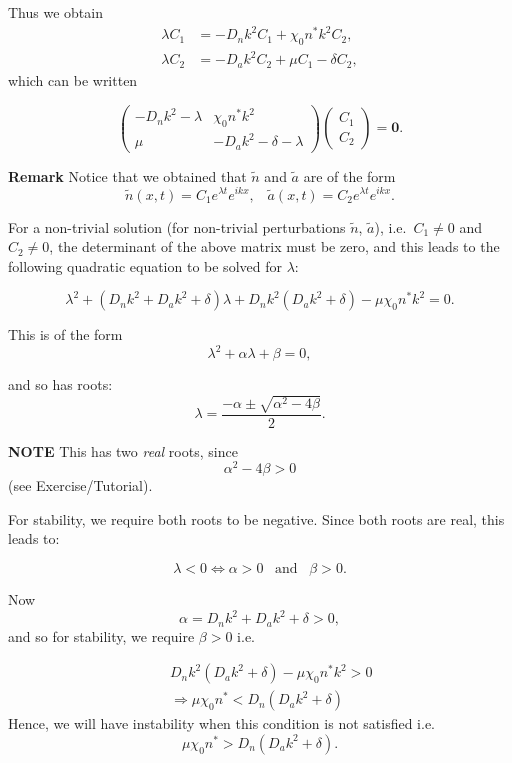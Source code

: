 \documentclass[
  letterpaper,
  DIV=11,
  numbers=noendperiod]{scrreprt}
\theoremstyle{plain}
\theoremstyle{definition}
\theoremstyle{plain}
\theoremstyle{remark}
\begin{document}
Thus we obtain \[
\begin{aligned}
\lambda C_1 & =  - D_n k^2 C_1  + \chi_0 n^* k^2 C_2,  \\
\lambda C_2 & = - D_a k^2 C_2 +  \mu C_1 - \delta C_2,
\end{aligned}
\] which can be written

\[
\left(
\begin{array}{cc}
- D_n k^2 - \lambda &  \chi_0 n^* k^2 \\
\mu & - D_a k^2 -\delta -\lambda 
\end{array}
\right) 
\left(
\begin{array}{c}
C_1 \\
C_2
\end{array}
\right) = \mathbf{0} .
\]

\textbf{Remark} Notice that we obtained that \(\tilde n\) and
\(\tilde a\) are of the form
\[\tilde{n}(x,t) = C_1 e^{\lambda t} e^{ikx}, \;\;\; \tilde{a}(x,t) = C_2 e^{\lambda t} e^{ikx}.\]

For a non-trivial solution (for non-trivial perturbations \(\tilde n\),
\(\tilde a\)), i.e.~\(C_1 \neq 0\) and \(C_2 \neq 0\), the determinant
of the above matrix must be zero, and this leads to the following
quadratic equation to be solved for \(\lambda\):

\[
\lambda^2 + \left( D_n k^2 + D_a k^2 + \delta \right) \lambda + D_n k^2 \left( D_a k^2 + \delta \right) - \mu \chi_0 n^* k^2 = 0.
\]

This is of the form \[
\lambda^2 + \alpha \lambda + \beta = 0,
\]

and so has roots: \[
\lambda = \frac{-\alpha \pm \sqrt{\alpha^2 - 4 \beta}}{2}.\]

\textbf{NOTE} This has two \emph{real} roots, since \[
\alpha^2 - 4 \beta > 0
\] (see Exercise/Tutorial).

For stability, we require both roots to be negative. Since both roots
are real, this leads to:

\[
\lambda < 0  \Leftrightarrow \alpha > 0 \;\;\; \text{and} \;\;\; \beta >0.
\]

Now \[\alpha = D_n k^2 + D_a k^2 + \delta > 0,
\] and so for stability, we require \(\beta > 0\) i.e.~

\[
\begin{aligned}
& & D_n k^2 \left( D_a k^2 + \delta \right) - \mu \chi_0 n^* k^2 > 0 \\
& & \Rightarrow \mu \chi_0 n^* <  D_n  \left( D_a k^2 + \delta \right)
\end{aligned}
\] Hence, we will have instability when this condition is not satisfied
i.e.~ \[
\mu \chi_0 n^* >  D_n  \left( D_a k^2 + \delta \right).
\]
\end{document}
